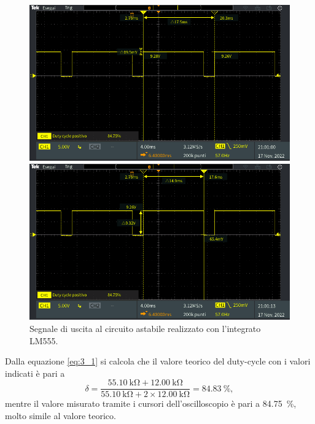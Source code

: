 \begin{figure}[tbh]
	\centering
	\begin{minipage}{.496\textwidth}
		\includegraphics[width=\linewidth]{./ImageFiles/Laboratorio 5/TEK00014.PNG}
	\end{minipage}
	\begin{minipage}{.496\textwidth}
		\includegraphics[width=\linewidth]{./ImageFiles/Laboratorio 5/TEK00015.PNG}
	\end{minipage}
	\caption{Segnale di uscita al circuito astabile realizzato con l'integrato LM555.}
	\label{fig:circuito_3_scope}
\end{figure}
Dalla equazione \ref{eq:3_1} si calcola che il valore teorico del duty-cycle con i valori indicati è pari a
\begin{equation}
	\delta=\frac{\SI{55.10}{\kilo\ohm}+\SI{12.00}{\kilo\ohm}}{\SI{55.10}{\kilo\ohm}+2\times\SI{12.00}{\kilo\ohm}}=\SI{84.83}{\percent},
\end{equation}
mentre il valore misurato tramite i cursori dell'oscilloscopio è pari a \SI{84.75}{\percent}, molto simile al valore teorico.

